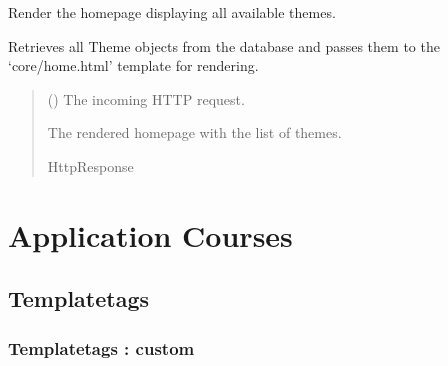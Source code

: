 \documentclass[letterpaper,10pt,english]{sphinxmanual}
\begin{document}
\begin{fulllineitems}
\label{\detokenize{core:core.views.home}}
\pysigstartsignatures
\pysiglinewithargsret
{}
{}
{}
\pysigstopsignatures
\sphinxAtStartPar
Render the homepage displaying all available themes.

\sphinxAtStartPar
Retrieves all Theme objects from the database and passes them
to the ‘core/home.html’ template for rendering.
\begin{quote}\begin{description}
\sphinxAtStartPar
{} () \textendash{} The incoming HTTP request.

\sphinxAtStartPar
The rendered homepage with the list of themes.

\sphinxAtStartPar
HttpResponse

\end{description}\end{quote}

\end{fulllineitems}


\sphinxstepscope


\chapter{Application Courses}
\label{\detokenize{courses:application-courses}}\label{\detokenize{courses::doc}}

\section{Templatetags}
\label{\detokenize{courses:templatetags}}
\sphinxstepscope


\subsection{Templatetags : custom}
\label{\detokenize{courses.templatetags:module-courses.templatetags.custom_tags}}\label{\detokenize{courses.templatetags:templatetags-custom}}\label{\detokenize{courses.templatetags::doc}}
\end{document}
